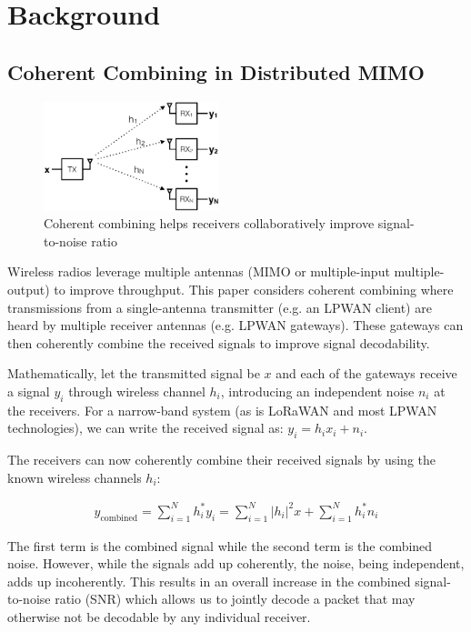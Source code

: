 \section{Background}
\label{sec:background}

\subsection{Coherent Combining in Distributed MIMO}
\label{sec:simo}

\begin{figure}[htb]
    \centering
    \includegraphics[height=1.25in]{figures/SIMO_cropped}
    \caption{Coherent combining helps receivers collaboratively improve
        signal-to-noise ratio}
    \label{fig:simo}
    \compactimg
\end{figure}

Wireless radios leverage multiple antennas (MIMO or multiple-input
multiple-output) to improve throughput. This paper considers coherent
combining where transmissions from a single-antenna transmitter (e.g. an
LPWAN client) are heard by multiple receiver antennas (e.g. LPWAN gateways).
These gateways can then coherently combine the received signals to improve
signal decodability.

Mathematically, let the transmitted signal be $x$ and each of the gateways
receive a signal $y_i$ through wireless channel $h_i$, introducing an
independent noise $n_i$ at the receivers. For a narrow-band system (as is
LoRaWAN and most LPWAN technologies), we can write the received signal as:
$y_i = h_i x_i + n_i $.

The receivers can now coherently combine their received signals by using the
known wireless channels $h_i$:

\begin{align*}
y_{\text{combined}}
	= \sum_{i=1}^N h^*_i y_i
	= \sum_{i=1}^N \left| h_i \right|^2 x + \sum_{i=1}^N h^*_i n_i
\end{align*}

The first term is the combined signal while the second term is the combined
noise. However, while the signals add up coherently, the noise, being
independent, adds up incoherently.  This results in an overall increase in the
combined signal-to-noise ratio (SNR) which allows us to jointly decode a
packet that may otherwise not be decodable by any individual receiver.

